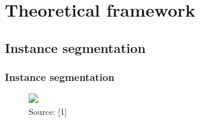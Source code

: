 \documentclass{beamer}
\begin{document}
\section{Theoretical framework}

\subsection{Instance segmentation}

\begin{frame}

\frametitle{Instance segmentation}


\begin{figure}[ht]
	\includegraphics<1>[width=0.9\textwidth]{pictures/segmentations.png}
	\caption{Source: [1]}
\end{figure}

\end{frame}
\end{document}
